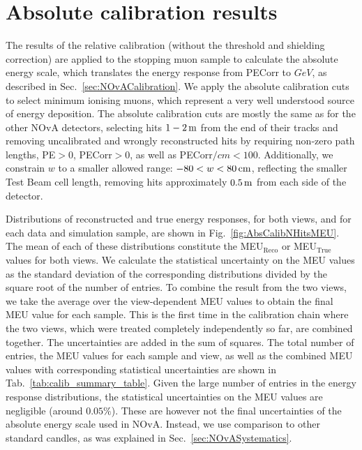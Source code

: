 \FloatBarrier
\section{Absolute calibration results}\label{sec:TBAbsoluteCalib}
The results of the relative calibration (without the threshold and shielding correction) are applied to the stopping muon sample to calculate the absolute energy scale,  which translates the energy response from \gls{PECorr} to $\unit{GeV}$, as described in Sec.~\ref{sec:NOvACalibration}. We apply the absolute calibration cuts to select minimum ionising muons, which represent a very well understood source of energy deposition. The absolute calibration cuts are mostly the same as for the other \gls{NOvA} detectors, selecting hits $1-\unit[2]{m}$ from the end of their tracks and removing uncalibrated and wrongly reconstructed hits by requiring non-zero path lengths, \gls{PE}$>0$, \gls{PECorr}$>0$, as well as \gls{PECorr}$\unit{/cm}<100$. Additionally, we constrain $w$ to a smaller allowed range: $-80<w<\unit[80]{cm}$, reflecting the smaller Test Beam cell length, removing hits approximately $\unit[0.5]{m}$ from each side of the detector.

Distributions of reconstructed and true energy responses, for both views, and for each data and simulation sample, are shown in Fig.~\ref{fig:AbsCalibNHitsMEU}. The mean of each of these distributions constitute the \gls{MEU}$_{\mathrm{Reco}}$ or \gls{MEU}$_{\mathrm{True}}$ values for both views. We calculate the statistical uncertainty on the \gls{MEU} values as the standard deviation of the corresponding distributions divided by the square root of the number of entries. To combine the result from the two views, we take the average over the view-dependent \gls{MEU} values to obtain the final \gls{MEU} value for each sample. This is the first time in the calibration chain where the two views, which were treated completely independently so far, are combined together. The uncertainties are added in the sum of squares. The total number of entries, the \gls{MEU} values for each sample and view, as well as the combined \gls{MEU} values with corresponding statistical uncertainties are shown in Tab.~\ref{tab:calib_summary_table}. Given the large number of entries in the energy response distributions, the statistical uncertainties on the \gls{MEU} values are negligible (around $0.05\%$). These are however not the final uncertainties of the absolute energy scale used in \gls{NOvA}. Instead, we use comparison to other standard candles, as was explained in Sec.~\ref{sec:NOvASystematics}.

